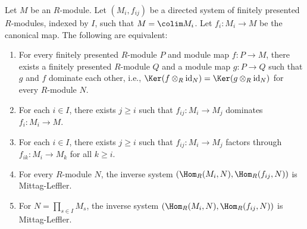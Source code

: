 \begin{proposition}
\label{proposition-ML-characterization}
Let $M$ be an $R$-module.  Let $(M_i, f_{ij})$ be a directed system of finitely
presented $R$-modules, indexed by $I$, such that $M = \colim M_i$.  Let
$f_i:
M_i \to M$ be the canonical map.  The following are equivalent:
\begin{enumerate}
\item For every finitely presented $R$-module $P$ and module map $f: P
\to M$, there exists a finitely presented $R$-module $Q$ and a module
map $g: P \to Q$ such that $g$ and $f$ dominate each other, i.e.,
$\Ker(f \otimes_R \text{id}_N) = \Ker(g \otimes_R \text{id}_N)$
for every $R$-module $N$.
\item For each $i \in I$, there exists $j \geq i$ such that $f_{ij}: M_i
\to M_j$ dominates $f_i: M_i \to M$.
\item For each $i \in I$, there exists $j \geq i$ such that $f_{ij}: M_i
\to M_j$ factors through $f_{ik}: M_i \to M_k$ for all $k \geq
i$.
\item For every $R$-module $N$, the inverse system
$(\Hom_R(M_i, N), \Hom_R(f_{ij}, N))$ is Mittag-Leffler.
\item For $N = \prod_{s \in I} M_s$, the inverse system
$(\Hom_R(M_i, N), \Hom_R(f_{ij}, N))$ is Mittag-Leffler.
\end{enumerate}
\end{proposition}


